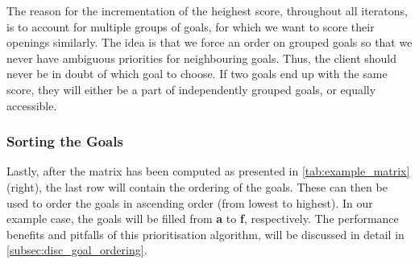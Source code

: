 The reason for the incrementation of the heighest score, throughout all iteratons, is to account for multiple groups of goals, for which we want to score their openings similarly.
The idea is that we force an order on grouped goals so that we never have ambiguous priorities for neighbouring goals.
Thus, the client should never be in doubt of which goal to choose.
If two goals end up with the same score, they will either be a part of independently grouped goals, or equally accessible.


\subsubsection{Sorting the Goals}
Lastly, after the matrix has been computed as presented in \cref{tab:example_matrix} (right), the last row will contain the ordering of the goals.
These can then be used to order the goals in ascending order (from lowest to highest).
In our example case, the goals will be filled from \textbf{a} to \textbf{f}, respectively.
The performance benefits and pitfalls of this prioritisation algorithm, will be discussed in detail in \cref{subsec:disc_goal_ordering}.
%





